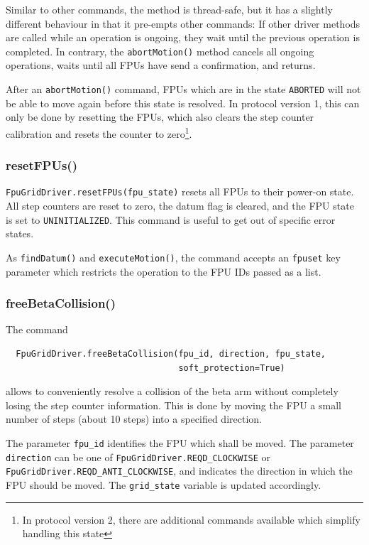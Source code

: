 \documentclass[11pt,a4paper]{scrartcl}
\begin{document}
Similar to other commands, the method is thread-safe, but it has a
slightly different behaviour in that it pre-empts other commands: If
other driver methods are called while an operation is ongoing, they
wait until the previous operation is completed. In contrary, the
\texttt{abortMotion()} method cancels all ongoing operations, waits
until all FPUs have send a confirmation, and returns.

After an \texttt{abortMotion()} command, FPUs which are in the state
\texttt{ABORTED} will not be able to move again before this state is
resolved. In protocol version 1, this can only be done by resetting
the FPUs, which also clears the step counter calibration and resets
the counter to zero\footnote{In protocol version 2, there are
  additional commands available which simplify handling this state}.


\subsubsection{resetFPUs()}

\texttt{FpuGridDriver.resetFPUs(fpu\_state)} resets all FPUs to their
power-on state. All step counters are reset to zero, the datum flag is
cleared, and the FPU state is set to \texttt{UNINITIALIZED}. This
command is useful to get out of specific error states. 

As \texttt{findDatum()} and \texttt{executeMotion()}, the command
accepts an \texttt{fpuset} key parameter which restricts the operation
to the FPU IDs passed as a list.

\subsubsection{freeBetaCollision()}

The command
\begin{verbatim}
  FpuGridDriver.freeBetaCollision(fpu_id, direction, fpu_state,
                                  soft_protection=True)
\end{verbatim}
allows to conveniently resolve a collision
of the beta arm without completely losing the step counter
information. This is done by moving the FPU a small number of steps
(about 10 steps) into a specified direction.

\begin{sloppypar}
The parameter \texttt{fpu\_id} identifies the FPU which shall be
moved. The parameter \texttt{direction} can be one of
\texttt{FpuGridDriver.REQD\_CLOCKWISE} or
\texttt{FpuGridDriver.REQD\_ANTI\_CLOCKWISE}, and indicates the
direction in which the FPU should be moved. The \texttt{grid\_state}
variable is updated accordingly.
\end{sloppypar}
\end{document}
